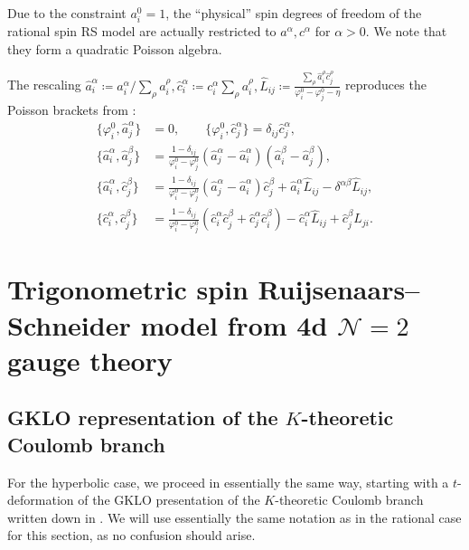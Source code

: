 \begin{remark}
    Due to the constraint $a_i^0 = 1$, the ``physical'' spin degrees of freedom of the rational spin RS model are actually restricted to $a^\alpha,c^\alpha$ for $\alpha > 0$. We note that they form a quadratic Poisson algebra.
\end{remark}

\begin{corollary}
The rescaling $\hat a_i^\alpha \coloneq a_i^\alpha/\sum_\rho a_i^\rho, \hat c_i^\alpha \coloneq c_i^\alpha \sum_\rho a_i^\rho, \hat L_{ij} \coloneq \frac{\sum_\rho \hat a_i^\rho \hat c_j^\rho}{\varphi_i^0-\varphi_j^0-\eta}$ reproduces the Poisson brackets from \cite{arutyunov_hamiltonian_1998}:
\begin{align}
    \{ \varphi_i^0, \hat a_j^\alpha \} &= 0, \qquad \{ \varphi_i^0, \hat c_j^\alpha \} = \delta_{ij} \hat c_j^\alpha, \\[8pt]
    \{ \hat a_i^\alpha, \hat a_j^\beta \} &= \frac{1-\delta_{ij}}{\varphi_i^0-\varphi_j^0} (\hat a_j^\alpha-\hat a_i^\alpha) (\hat a_i^\beta-\hat a_j^\beta),
    \\[4pt]
    \{ \hat a_i^\alpha, \hat c_j^\beta \} &= \frac{1-\delta_{ij}}{\varphi_i^0-\varphi_j^0} (\hat a_j^\alpha-\hat a_i^\alpha) \hat c_j^\beta + \hat a_i^\alpha \hat L_{ij} - \delta^{\alpha\beta} \hat L_{ij},
    \\[4pt]
    \{ \hat c_i^\alpha, \hat c_j^\beta \} &= \frac{1-\delta_{ij}}{\varphi_i^0-\varphi_j^0} (\hat c_i^\alpha \hat c_j^\beta + \hat c_j^\alpha \hat c_i^\beta) - \hat c_i^\alpha \hat L_{ij} + \hat c_j^\beta \hat L_{ji}.
\end{align}
\end{corollary}


\section{Trigonometric spin Ruijsenaars--Schneider model from 4d $\mathcal{N}=2$ gauge theory}

\subsection{GKLO representation of the $K$-theoretic Coulomb branch}

For the hyperbolic case, we proceed in essentially the same way, starting with a $t$-deformation of the GKLO presentation of the $K$-theoretic Coulomb branch written down in \cite{finkelberg_shifted_2019,tsymbaliuk_difference_2023}. We will use essentially the same notation as in the rational case for this section, as no confusion should arise.

